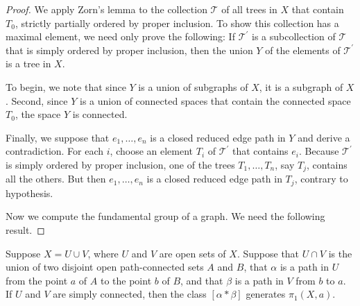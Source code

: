 \begin{proof}
	We apply Zorn's lemma to the collection \(\mathcal{T}\) of all trees in \(X\) that contain \(T_{0}\), strictly partially ordered by proper inclusion. To show this collection has a maximal element, we need only prove the following:
If \(\mathcal{T}^{\prime }\) is a subcollection of \(\mathcal{T}\) that is simply ordered by proper inclusion, then the union \(Y\) of the elements of \(\mathcal{T}^{\prime }\) is a tree in \(X\).

To begin, we note that since \(Y\) is a union of subgraphs of \(X\), it is a subgraph of \(X\). Second, since \(Y\) is a union of connected spaces that contain the connected space \(T_{0}\), the space \(Y\) is connected.

Finally, we suppose that \(e_{1},\ldots ,e_{n}\) is a closed reduced edge path in \(Y\) and derive a contradiction. For each \(i\), choose an element \(T_{i}\) of \(\mathcal{T}^{\prime }\) that contains \(e_{i}\). Because \(\mathcal{T}^{\prime }\) is simply ordered by proper inclusion, one of the trees \(T_{1},\ldots ,T_{n}\), say \(T_{j}\), contains all the others. But then \(e_{1},\ldots ,e_{n}\) is a closed reduced edge path in \(T_{j}\), contrary to hypothesis.

Now we compute the fundamental group of a graph. We need the following result.
\end{proof}
\begin{lemma}
\label{lem:\thetheorem}
	Suppose \(X = U \cup V\), where \(U\) and \(V\) are open sets of \(X\). Suppose that \(U \cap V\) is the union of two disjoint open path-connected sets \(A\) and \(B\), that \(\alpha\) is a path in \(U\) from the point \(a\) of \(A\) to the point \(b\) of \(B\), and that \(\beta\) is a path in \(V\) from \(b\) to \(a\). If \(U\) and \(V\) are simply connected, then the class \([ {\alpha * \beta }]\) generates \({\pi }_{1}( {X,a})\).
\end{lemma}

